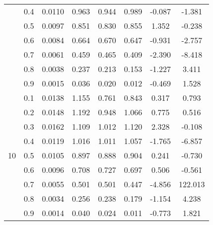 \documentclass[11pt,a4paper]{report}
\begin{document}
\begin{longtable}{ | c | c || c | c | c | c | c | c | }
 & 0.4 & 0.0110 & 0.963 & 0.944 & 0.989 & -0.087 & -1.381 \\
 & 0.5 & 0.0097 & 0.851 & 0.830 & 0.855 & 1.352 & -0.238 \\
 & 0.6 & 0.0084 & 0.664 & 0.670 & 0.647 & -0.931 & -2.757 \\
 & 0.7 & 0.0061 & 0.459 & 0.465 & 0.409 & -2.390 & -8.418 \\
 & 0.8 & 0.0038 & 0.237 & 0.213 & 0.153 & -1.227 & 3.411 \\
 & 0.9 & 0.0015 & 0.036 & 0.020 & 0.012 & -0.469 & 1.528 \\
 \hline
\multirow{9}{*}{10} & 0.1 & 0.0138 & 1.155 & 0.761 & 0.843 & 0.317 & 0.793 \\
 & 0.2 & 0.0148 & 1.192 & 0.948 & 1.066 & 0.775 & 0.516 \\
 & 0.3 & 0.0162 & 1.109 & 1.012 & 1.120 & 2.328 & -0.108 \\
 & 0.4 & 0.0119 & 1.016 & 1.011 & 1.057 & -1.765 & -6.857 \\
 & 0.5 & 0.0105 & 0.897 & 0.888 & 0.904 & 0.241 & -0.730 \\
 & 0.6 & 0.0096 & 0.708 & 0.727 & 0.697 & 0.506 & -0.561 \\
 & 0.7 & 0.0055 & 0.501 & 0.501 & 0.447 & -4.856 & 122.013 \\
 & 0.8 & 0.0034 & 0.256 & 0.238 & 0.179 & -1.154 & 4.238 \\
 & 0.9 & 0.0014 & 0.040 & 0.024 & 0.011 & -0.773 & 1.821 \\
 \hline
\hline
\end{longtable}
\end{document}
